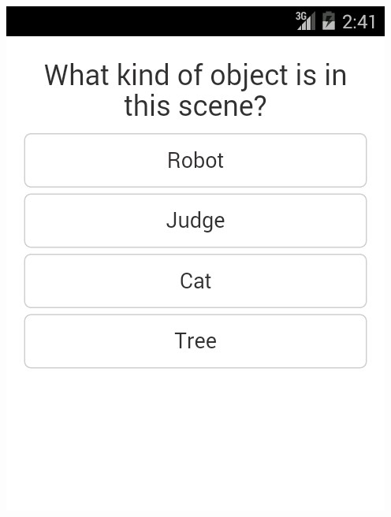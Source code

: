 \documentclass[aspectratio=169]{beamer}
\begin{document}
\begin{frame}
\begin{columns}[c]
\begin{column}{0.5\columnwidth}
      \includegraphics[width=\columnwidth]{ss_quickpic_options}
    \end{column}
  \end{columns}
\end{frame}

\end{document}
